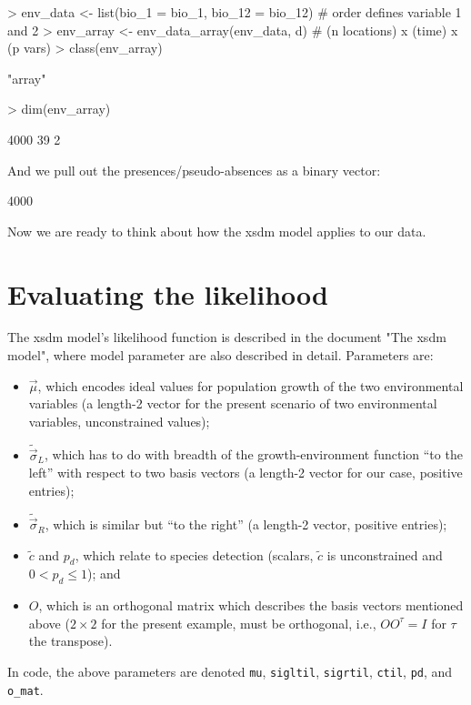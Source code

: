\documentclass[11pt]{article}
\begin{document}
\begin{Schunk}
\begin{Sinput}
> env_data <- list(bio_1 = bio_1, bio_12 = bio_12)  # order defines variable 1 and 2
> env_array <- env_data_array(env_data, d)  # (n locations) x (time) x (p vars)
> class(env_array)
\end{Sinput}
\begin{Soutput}
[1] "array"
\end{Soutput}
\begin{Sinput}
> dim(env_array) 
\end{Sinput}
\begin{Soutput}
[1] 4000   39    2
\end{Soutput}
\end{Schunk}

\noindent And we pull out the presences/pseudo-absences as a binary vector:
\begin{Schunk}
\begin{Soutput}
[1] 4000
\end{Soutput}
\end{Schunk}

\noindent Now we are ready to think about how the xsdm model applies to our data.

\section{Evaluating the likelihood}

The xsdm model's likelihood function is described in the document "The xsdm model",
where model parameter are also described in detail. Parameters are:
\begin{itemize}
\item $\vec{\mu}$, which encodes ideal values for population growth 
of the two environmental variables (a length-2 vector for the present 
scenario of two environmental variables, unconstrained values); 
\item $\tilde{\vec{\sigma}}_L$, which has to do with breadth of the growth-environment
function ``to the left'' with respect to two basis vectors (a length-2 vector for our case,
positive entries);
\item $\tilde{\vec{\sigma}}_R$, which is similar but ``to the right'' (a length-2 vector,
positive entries);
\item $$ and $p_d$, which relate to species detection (scalars, $$ is 
unconstrained and $0<p_d$); and
\item $O$, which is an orthogonal matrix which 
describes the basis vectors mentioned above ($2 $ for the present example, must be
orthogonal, i.e., $OO^{\tau}=I$ for $\tau$ the transpose).
\end{itemize}
In code, the above parameters are denoted \texttt{mu}, \texttt{sigltil}, \texttt{sigrtil},
\texttt{ctil}, \texttt{pd}, and \texttt{o\_mat}.
\end{document}
